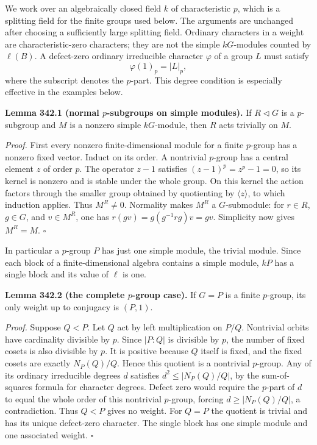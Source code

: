 \documentclass[11pt]{article}
\begin{document}
We work over an algebraically closed field $k$ of characteristic $p$, which is a splitting field for the finite groups used below. The arguments are unchanged after choosing a sufficiently large splitting field. Ordinary characters in a weight are characteristic-zero characters; they are not the simple $kG$-modules counted by $\ell(B)$. A defect-zero ordinary irreducible character $\varphi$ of a group $L$ must satisfy
\[
 \varphi(1)_p=|L|_p,
\]
where the subscript denotes the $p$-part. This degree condition is especially effective in the examples below.

\textbf{Lemma 342.1 (normal $p$-subgroups on simple modules).} If $R\lhd G$ is a $p$-subgroup and $M$ is a nonzero simple $kG$-module, then $R$ acts trivially on $M$.

\emph{Proof.} First every nonzero finite-dimensional module for a finite $p$-group has a nonzero fixed vector. Induct on its order. A nontrivial $p$-group has a central element $z$ of order $p$. The operator $z-1$ satisfies $(z-1)^p=z^p-1=0$, so its kernel is nonzero and is stable under the whole group. On this kernel the action factors through the smaller group obtained by quotienting by $\langle z\rangle$, to which induction applies. Thus $M^R\ne0$. Normality makes $M^R$ a $G$-submodule: for $r\in R$, $g\in G$, and $v\in M^R$, one has $r(gv)=g(g^{-1}rg)v=gv$. Simplicity now gives $M^R=M$. $\square$

In particular a $p$-group $P$ has just one simple module, the trivial module. Since each block of a finite-dimensional algebra contains a simple module, $kP$ has a single block and its value of $\ell$ is one.

\textbf{Lemma 342.2 (the complete $p$-group case).} If $G=P$ is a finite $p$-group, its only weight up to conjugacy is $(P,1)$.

\emph{Proof.} Suppose $Q<P$. Let $Q$ act by left multiplication on $P/Q$. Nontrivial orbits have cardinality divisible by $p$. Since $|P:Q|$ is divisible by $p$, the number of fixed cosets is also divisible by $p$. It is positive because $Q$ itself is fixed, and the fixed cosets are exactly $N_P(Q)/Q$. Hence this quotient is a nontrivial $p$-group. Any of its ordinary irreducible degrees $d$ satisfies $d^2\leq|N_P(Q)/Q|$, by the sum-of-squares formula for character degrees. Defect zero would require the $p$-part of $d$ to equal the whole order of this nontrivial $p$-group, forcing $d\geq|N_P(Q)/Q|$, a contradiction. Thus $Q<P$ gives no weight. For $Q=P$ the quotient is trivial and has its unique defect-zero character. The single block has one simple module and one associated weight. $\square$
\end{document}
